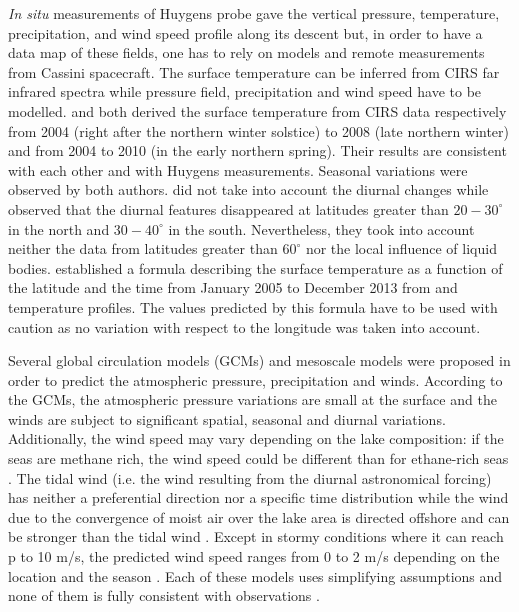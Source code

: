 \textit{In situ} measurements of Huygens probe gave the vertical pressure, temperature, precipitation, and wind speed profile along its descent but, in order to have a data map of these fields, one has to rely on models and remote measurements from Cassini spacecraft. The surface temperature can be inferred from CIRS far infrared spectra while pressure field, precipitation and wind speed have to be modelled. \citet{jennings2009titan} and \citet{cottini2012spatial} both derived the surface temperature from CIRS data respectively from 2004 (right after the northern winter solstice) to 2008 (late northern winter) and from 2004 to 2010 (in the early northern spring). Their results are consistent with each other and with Huygens measurements. Seasonal variations were observed by both authors. \citet{jennings2009titan} did not take into account the diurnal changes while \citet{cottini2012spatial} observed that the diurnal features disappeared at latitudes greater than $20-30^\circ$ in the north and $30-40^\circ$ in the south. Nevertheless, they took into account neither the data from latitudes greater than $60^\circ$ nor the local influence of liquid bodies. \citet{tan2015titan} established a formula describing the surface temperature as a function of the latitude and the time from January 2005 to December 2013 from \citet{jennings2011seasonal} and \citet{cottini2012spatial} temperature profiles. The values predicted by this formula have to be used with caution as no variation with respect to the longitude was taken into account. 

Several global circulation models (GCMs) \citep[e.g.][]{tokano2008dune, tokano2009impact, friedson2009global, lebonnois2012titan,newman2011stratospheric,newman2016simulating, schneider2012polar} and mesoscale models \citep{soto2015mesoscale,charnay2015methane} were proposed in order to predict the atmospheric pressure, precipitation and winds. According to the GCMs, the atmospheric pressure variations are small at the surface and the winds are subject to significant spatial, seasonal and diurnal variations. Additionally, the wind speed may vary depending on the lake composition: if the seas are methane rich, the wind speed could be different than for ethane-rich seas \citep{tokano2009impact,lorenz2012winds}. The tidal wind (i.e. the wind resulting from the diurnal astronomical forcing) has neither a preferential direction nor a specific time distribution while the wind due to the convergence of moist air over the lake area is directed offshore and can be stronger than the tidal wind \citep{tokano2009impact}. Except in stormy conditions where it can reach p to 10 m/s, the predicted wind speed ranges from 0 to 2 m/s depending on the location and the season \citep{lorenz2012winds, lorenz2013oceanography}. Each of these models uses simplifying assumptions and none of them is fully consistent with observations \citep{schneider2012polar}. 
 



